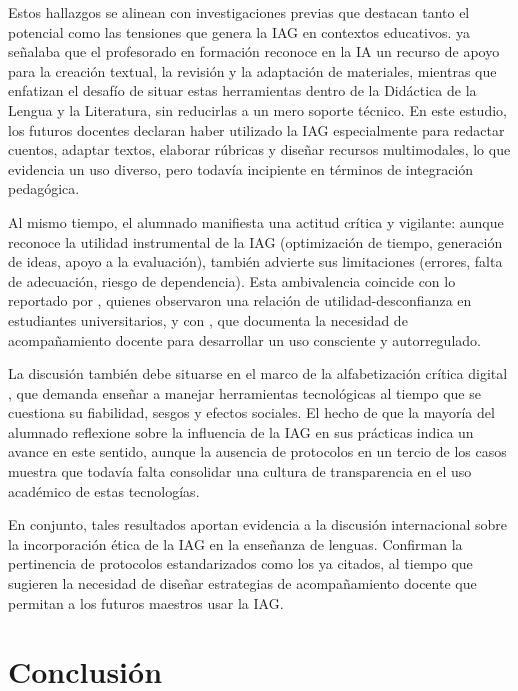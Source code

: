 \documentclass[spanish]{textolivre}
\begin{document}
Estos hallazgos se alinean con investigaciones previas que destacan tanto el potencial como las tensiones que genera la IAG en contextos educativos. \textcite{SanchezVera2024} ya señalaba que el profesorado en formación reconoce en la IA un recurso de apoyo para la creación textual, la revisión y la adaptación de materiales, mientras que \textcite{RoviraColladoMartinezCarratalaMiras2024} enfatizan el desafío de situar estas herramientas dentro de la Didáctica de la Lengua y la Literatura, sin reducirlas a un mero soporte técnico. En este estudio, los futuros docentes declaran haber utilizado la IAG especialmente para redactar cuentos, adaptar textos, elaborar rúbricas y diseñar recursos multimodales, lo que evidencia un uso diverso, pero todavía incipiente en términos de integración pedagógica.

Al mismo tiempo, el alumnado manifiesta una actitud crítica y vigilante: aunque reconoce la utilidad instrumental de la IAG (optimización de tiempo, generación de ideas, apoyo a la evaluación), también advierte sus limitaciones (errores, falta de adecuación, riesgo de dependencia). Esta ambivalencia coincide con lo reportado por \textcite{MartinMarchante2022,Gragera2024}, quienes observaron una relación de utilidad-desconfianza en estudiantes universitarios, y con \textcite{Lindin2024}, que documenta la necesidad de acompañamiento docente para desarrollar un uso consciente y autorregulado.

La discusión también debe situarse en el marco de la alfabetización crítica digital \cite{UbalCamachoTambascoMartinezGarciaCorrea2023,CervantesBarriosMonteceMoranteMeraMedina2024}, que demanda enseñar a manejar herramientas tecnológicas al tiempo que se cuestiona su fiabilidad, sesgos y efectos sociales. El hecho de que la mayoría del alumnado reflexione sobre la influencia de la IAG en sus prácticas indica un avance en este sentido, aunque la ausencia de protocolos en un tercio de los casos muestra que todavía falta consolidar una cultura de transparencia en el uso académico de estas tecnologías.

En conjunto, tales resultados aportan evidencia a la discusión internacional sobre la incorporación ética de la IAG en la enseñanza de lenguas. Confirman la pertinencia de protocolos estandarizados como los ya citados, al tiempo que sugieren la necesidad de diseñar estrategias de acompañamiento docente que permitan a los futuros maestros usar la IAG.

\section{Conclusión}
\end{document}
